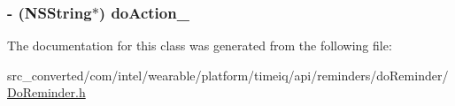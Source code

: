 \subsubsection[{do\+Action\+\_\+}]{\setlength{\rightskip}{0pt plus 5cm}-\/ (N\+S\+String$\ast$) do\+Action\+\_\+}\label{interface_do_reminder___do_reminder_builder_a83f0c6413bbed0c339911ff382e1578e}


The documentation for this class was generated from the following file\+:\begin{DoxyCompactItemize}
\item 
src\+\_\+converted/com/intel/wearable/platform/timeiq/api/reminders/do\+Reminder/\hyperlink{_do_reminder_8h}{Do\+Reminder.\+h}\end{DoxyCompactItemize}
